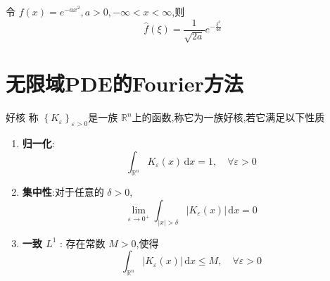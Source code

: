 \documentclass[../../main.tex]{subfiles}
\begin{document}
\hspace*{\fill} 
\begin{example}
    令 \(  f\left( x \right)= e^{-ax^{2}},a> 0,-\infty< x< \infty   \),则 \[
    \hat{f}\left(  \xi  \right)= \frac{1 }{\sqrt{2a} }e^{-\frac{ \xi ^{2} }{4a} }  
    \] 
\end{example}

\section{无限域PDE的Fourier方法}

\begin{definition}{好核}
    称 \(  \left\{  K _{ \varepsilon } \right\}_{ \varepsilon > 0}  \)是一族 \(  \mathbb{R} ^{n}  \)上的函数,称它为一族好核,若它满足以下性质
    \begin{enumerate}
        \item \textbf{归一化}: \[
        \int_{\mathbb{R} ^{n}} K _{ \varepsilon }\left( x \right)\,\mathrm{d} x= 1,\quad \forall  \varepsilon > 0 
        \]
        \item \textbf{集中性}:对于任意的 \(   \delta > 0  \), \[
        \lim_{ \varepsilon \to 0^{+ }}\int_{\left| x \right|>  \delta  }\left|  K _{ \varepsilon }\left( x \right)  \right|\,\mathrm{d} x= 0 
        \] 
        \item \textbf{一致 \(  L^{1}  \) }: 存在常数 \(  M> 0  \),使得 \[
        \int_{\mathbb{R} ^{n}}\left|  K_{ \varepsilon }\left( x \right)  \right|\,\mathrm{d} x\le M,\quad \forall  \varepsilon > 0 
        \]   
    \end{enumerate}
      
\end{definition}
\end{document}
